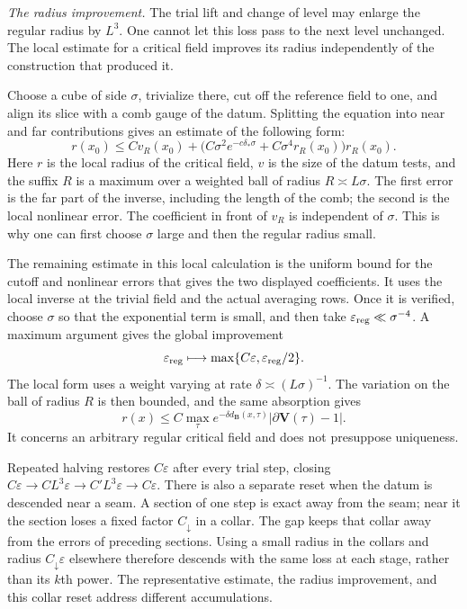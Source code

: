 \documentclass[11pt,letterpaper,reqno]{amsart}
\theoremstyle{definition}
\theoremstyle{remark}
\begin{document}
\emph{The radius improvement.}
The trial lift and change of level may enlarge
the regular radius by $L^3$. One cannot let this
loss pass to the next level unchanged. The
local estimate for a critical field improves
its radius independently of the construction
that produced it.

Choose a cube of side $\sigma$, trivialize
there, cut off the reference field to one,
and align its slice with a comb gauge of the
datum. Splitting the equation into near and
far contributions gives an estimate of the
following form:
\[
 r(x_0)\le Cv_R(x_0)
    +\big(C\sigma^2e^{-c\delta_*\sigma}
                       +C\sigma^4r_R(x_0)\big)r_R(x_0).
\]
Here $r$ is the local radius of the critical
field, $v$ is the size of the datum tests,
and the suffix $R$ is a maximum over a
weighted ball of radius $R\asymp L\sigma$.
The first error is the far part of the
inverse, including the length of the comb;
the second is the local nonlinear error.
The coefficient in front of $v_R$ is
independent of $\sigma$. This is why one
can first choose $\sigma$ large and then
the regular radius small.

The remaining estimate in this local
calculation is the uniform bound for the
cutoff and nonlinear errors that gives the
two displayed coefficients. It uses the
local inverse at the trivial field and
the actual averaging rows. Once it is
verified, choose $\sigma$ so that the
exponential term is small, and then take
$\varepsilon_{\rm reg}\ll\sigma^{-4}$.
A maximum argument gives the global
improvement
\[
 \varepsilon_{\rm reg}\longmapsto
                \max\{C\varepsilon,\varepsilon_{\rm reg}/2\}.
\]
The local form uses a weight varying at
rate $\delta\asymp(L\sigma)^{-1}$.
The variation on the ball of radius $R$
is then bounded, and the same absorption
gives
\[
 r(x)\le C\max_\tau
       e^{-\delta d_{\mathbf B}(x,\tau)}
                                      |\partial\mathbf V(\tau)-1|.
\]
It concerns an arbitrary regular critical
field and does not presuppose uniqueness.

Repeated halving restores $C\varepsilon$
after every trial step, closing
$C\varepsilon\to CL^3\varepsilon
\to C'L^3\varepsilon\to C\varepsilon$.
There is also a separate reset when the
datum is descended near a seam. A section
of one step is exact away from the seam;
near it the section loses a fixed factor
$C_\downarrow$ in a collar. The gap keeps
that collar away from the errors of
preceding sections. Using a small radius
in the collars and radius
$C_\downarrow\varepsilon$ elsewhere
therefore descends with the same loss
at each stage, rather than its $k$th
power. The representative estimate,
the radius improvement, and this collar
reset address different accumulations.
\end{document}
